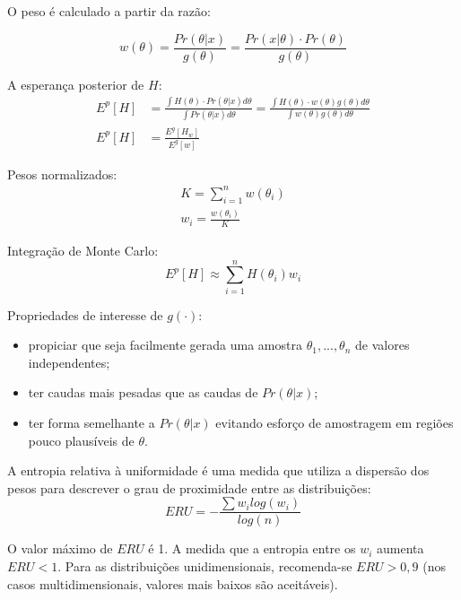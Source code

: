 O peso é calculado a partir da razão:

\begin{equation}
    w(\theta) = \frac{Pr(\theta|x)}{g(\theta)} = \frac{Pr(x|\theta)\cdot Pr(\theta)}{g(\theta)}
\end{equation}

A esperança posterior de $H$:
\begin{equation}
\begin{split}
    E^p[H] &= \frac{\int{H(\theta)\cdot Pr(\theta | x) d\theta}}{\int{Pr(\theta | x) d\theta}} = \frac{\int{H(\theta)\cdot w(\theta) g(\theta) d\theta}}{\int{w(\theta) g(\theta) d\theta}} \\
    E^p[H] &= \frac{E^g[H_w]}{E^g[w]}
\end{split}
\end{equation}

Pesos normalizados:
\begin{equation}
\begin{split}
    K = \sum_{i=1}^{n}{w(\theta_i)} \\
    w_i = \frac{w(\theta_i)}{K}
\end{split}
\end{equation}

Integração de Monte Carlo:
\begin{equation}
    E^p[H] \approx \sum_{i=1}^{n}{H(\theta_i) w_i}
\end{equation}

Propriedades de interesse de $g(\cdot)$:

\begin{itemize}
    \item propiciar que seja facilmente gerada uma amostra ${\theta_1,...,\theta_n}$ de valores independentes;
    \item ter caudas mais pesadas que as caudas de $Pr(\theta|x)$;
    \item ter forma semelhante a $Pr(\theta|x)$ evitando esforço de amostragem em regiões pouco plausíveis de $\theta$.
\end{itemize}

A entropia relativa à uniformidade é uma medida que utiliza a dispersão dos pesos para descrever o grau de proximidade entre as distribuições:
\begin{equation}
    ERU = -\frac{\sum{w_i log(w_i)}}{log(n)}
\end{equation}

O valor máximo de $ERU$ é 1. A medida que a entropia entre os $w_i$ aumenta $ERU < 1$. Para as distribuições unidimensionais, recomenda-se $ERU > 0,9$ (nos casos multidimensionais, valores mais baixos são aceitáveis).

